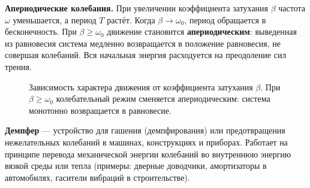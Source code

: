 \begin{remark}
\textbf{Апериодические колебания.} При увеличении коэффициента затухания $\beta$ частота $\omega$ уменьшается, а период $T$ растёт. Когда $\beta \to \omega_0$, период обращается в бесконечность. При $\beta \ge \omega_0$ движение становится \textbf{апериодическим}: выведенная из равновесия система медленно возвращается в положение равновесия, не совершая колебаний. Вся начальная энергия расходуется на преодоление сил трения.


\vspace{1cm}

\begin{figure}[htbp]
    \centering
    \caption{Зависимость характера движения от коэффициента затухания $\beta$. При $\beta \ge \omega_0$ колебательный режим сменяется апериодическим: система монотонно возвращается в равновесие.}
    \label{fig:damping_regimes}
\end{figure}

\par\noindent\textbf{Демпфер} --- устройство для гашения (демпфирования) или предотвращения нежелательных колебаний в машинах, конструкциях и приборах. Работает на принципе перевода механической энергии колебаний во внутреннюю энергию вязкой среды или тепла (примеры: дверные доводчики, амортизаторы в автомобилях, гасители вибраций в строительстве).
\end{remark}
